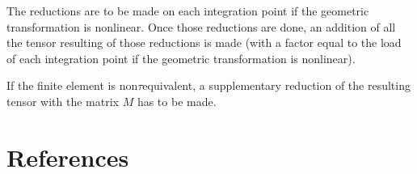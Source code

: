 \documentclass[a4paper,11pt,english]{sphinxmanual}
\begin{document}
The reductions are to be made on each integration point if the geometric
transformation is non\sphinxhyphen{}linear. Once those reductions are done, an addition of all
the tensor resulting of those reductions is made (with a factor equal to the load
of each integration point if the geometric transformation is non\sphinxhyphen{}linear).

If the finite element is non\sphinxhyphen{}\(\tau\)\sphinxhyphen{}equivalent, a supplementary reduction of the
resulting tensor with the matrix \(M\) has to be made.


\chapter{References}
\label{\detokenize{biblio:references}}\label{\detokenize{biblio:id1}}\label{\detokenize{biblio::doc}}
\end{document}
